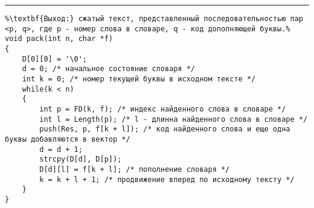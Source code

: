 \documentclass{article}
\begin{document}
\vspace{5pt} \hrule
\begin{lstlisting}[caption={Упаковка по методу Лемпела - Зива}, label=p229, escapechar=\%]
%\noindent\textbf{Вход:} исходный текст, заданный массивом кодов символов f: \textbf{array} [1..n] \textbf{of char}.\\%
%\textbf{Выход:} сжатый текст, представленный последовательностью пар <p, q>, где p - номер слова в словаре, q - код дополняющей буквы.%
void pack(int n, char *f)
{
	D[0][0] = '\0';
	d = 0; /* начальное состояние словаря */
	int k = 0; /* номер текущей буквы в исходном тексте */
	while(k < n)
	{
		int p = FD(k, f); /* индекс найденного слова в словаре */
		int l = Length(p); /* l - длинна найденного слова в словаре */
		push(Res, p, f[k + l]);	/* код найденного слова и еще одна буквы добавляются в вектор */
		d = d + 1;
		strcpy(D[d], D[p]);
		D[d][l] = f[k + l]; /* пополнение словаря */
		k = k + l + 1; /* продвижение вперед по исходному тексту */
	}
}
\end{lstlisting}
\end{document}
